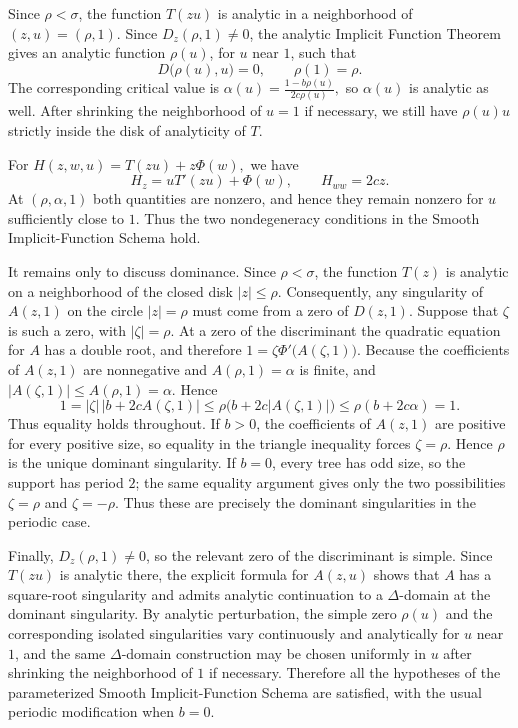 \documentclass[10pt,a4paper]{amsart}
\theoremstyle{remark}
\begin{document}
Since $\rho<\sigma$, the function $T(zu)$ is analytic in a neighborhood of
$(z,u)=(\rho,1)$.  Since $D_z(\rho,1)\neq0$, the analytic Implicit Function
Theorem gives an analytic function $\rho(u)$, for $u$ near $1$, such that
\[
D\big(\rho(u),u\big)=0,
\qquad \rho(1)=\rho.
\]
The corresponding critical value is
$
\alpha(u)=\frac{1-b\rho(u)}{2c\rho(u)},
$
so $\alpha(u)$ is analytic as well.  After shrinking the neighborhood of
$u=1$ if necessary, we still have $\rho(u)u$ strictly inside the disk of
analyticity of $T$.

For
$
H(z,w,u)=T(zu)+z\Phi(w),
$
we have
\[
H_z=uT'(zu)+\Phi(w),
\qquad
H_{ww}=2cz.
\]
At $(\rho,\alpha,1)$ both quantities are nonzero, and hence they remain
nonzero for $u$ sufficiently close to $1$.  Thus the two nondegeneracy
conditions in the Smooth Implicit-Function Schema hold.

It remains only to discuss dominance.  Since $\rho<\sigma$, the function
$T(z)$ is analytic on a neighborhood of the closed disk $|z|\leq\rho$.
Consequently, any singularity of $A(z,1)$ on the circle $|z|=\rho$ must
come from a zero of $D(z,1)$.  Suppose that $\zeta$ is such a zero, with
$|\zeta|=\rho$.  At a zero of the discriminant the quadratic equation for
$A$ has a double root, and therefore
$
1=\zeta\Phi'\big(A(\zeta,1)\big).
$
Because the coefficients of $A(z,1)$ are nonnegative and $A(\rho,1)=\alpha$
is finite, and
$
|A(\zeta,1)|\leq A(\rho,1)=\alpha.
$
Hence
\[
1
=|\zeta|\,|b+2cA(\zeta,1)|
\leq \rho\bigl(b+2c|A(\zeta,1)|\bigr)
\leq \rho(b+2c\alpha)
=1.
\]
Thus equality holds throughout.  If $b>0$, the coefficients of $A(z,1)$
are positive for every positive size, so equality in the triangle
inequality forces $\zeta=\rho$.  Hence $\rho$ is the unique dominant
singularity.  If $b=0$, every tree has odd size, so the support has period
$2$; the same equality argument gives only the two possibilities
$\zeta=\rho$ and $\zeta=-\rho$.  Thus these are precisely the dominant
singularities in the periodic case.

Finally, $D_z(\rho,1)\neq0$, so the relevant zero of the discriminant is
simple.  Since $T(zu)$ is analytic there, the explicit formula for $A(z,u)$
shows that $A$ has a square-root singularity and admits analytic
continuation to a $\Delta$-domain at the dominant singularity.  By analytic
perturbation, the simple zero $\rho(u)$ and the corresponding isolated
singularities vary continuously and analytically for $u$ near $1$, and the
same $\Delta$-domain construction may be chosen uniformly in $u$ after
shrinking the neighborhood of $1$ if necessary.  Therefore all the
hypotheses of the parameterized Smooth Implicit-Function Schema are
satisfied, with the usual periodic modification when $b=0$.
\end{document}
